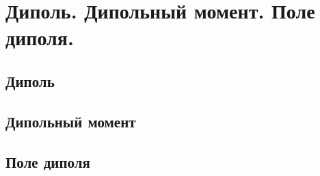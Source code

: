 \chapter{Диполь. Дипольный момент. Поле диполя.}

\section{Диполь}
\section{Дипольный момент}
\section{Поле диполя}
